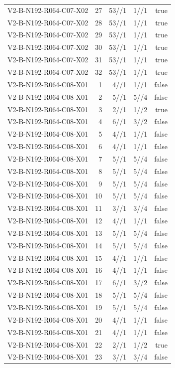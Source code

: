 {\begin{longtable}{lrrrr}
V2-B-N192-R064-C07-X02 & 27 & 53//1 & 1//1 & true \\
V2-B-N192-R064-C07-X02 & 28 & 53//1 & 1//1 & true \\
V2-B-N192-R064-C07-X02 & 29 & 53//1 & 1//1 & true \\
V2-B-N192-R064-C07-X02 & 30 & 53//1 & 1//1 & true \\
V2-B-N192-R064-C07-X02 & 31 & 53//1 & 1//1 & true \\
V2-B-N192-R064-C07-X02 & 32 & 53//1 & 1//1 & true \\
V2-B-N192-R064-C08-X01 & 1 & 4//1 & 1//1 & false \\
V2-B-N192-R064-C08-X01 & 2 & 5//1 & 5//4 & false \\
V2-B-N192-R064-C08-X01 & 3 & 2//1 & 1//2 & true \\
V2-B-N192-R064-C08-X01 & 4 & 6//1 & 3//2 & false \\
V2-B-N192-R064-C08-X01 & 5 & 4//1 & 1//1 & false \\
V2-B-N192-R064-C08-X01 & 6 & 4//1 & 1//1 & false \\
V2-B-N192-R064-C08-X01 & 7 & 5//1 & 5//4 & false \\
V2-B-N192-R064-C08-X01 & 8 & 5//1 & 5//4 & false \\
V2-B-N192-R064-C08-X01 & 9 & 5//1 & 5//4 & false \\
V2-B-N192-R064-C08-X01 & 10 & 5//1 & 5//4 & false \\
V2-B-N192-R064-C08-X01 & 11 & 3//1 & 3//4 & false \\
V2-B-N192-R064-C08-X01 & 12 & 4//1 & 1//1 & false \\
V2-B-N192-R064-C08-X01 & 13 & 5//1 & 5//4 & false \\
V2-B-N192-R064-C08-X01 & 14 & 5//1 & 5//4 & false \\
V2-B-N192-R064-C08-X01 & 15 & 4//1 & 1//1 & false \\
V2-B-N192-R064-C08-X01 & 16 & 4//1 & 1//1 & false \\
V2-B-N192-R064-C08-X01 & 17 & 6//1 & 3//2 & false \\
V2-B-N192-R064-C08-X01 & 18 & 5//1 & 5//4 & false \\
V2-B-N192-R064-C08-X01 & 19 & 5//1 & 5//4 & false \\
V2-B-N192-R064-C08-X01 & 20 & 4//1 & 1//1 & false \\
V2-B-N192-R064-C08-X01 & 21 & 4//1 & 1//1 & false \\
V2-B-N192-R064-C08-X01 & 22 & 2//1 & 1//2 & true \\
V2-B-N192-R064-C08-X01 & 23 & 3//1 & 3//4 & false \\

\end{longtable}}
